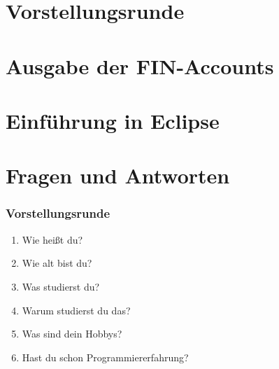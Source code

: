 \documentclass[12pt]{beamer}
\begin{document}
\section{Vorstellungsrunde}
\section{Ausgabe der FIN-Accounts}
\section{Einführung in Eclipse}
\section{Fragen und Antworten}

\begin{frame}
	\frametitle{Vorstellungsrunde}
	\begin{enumerate}
		\item Wie heißt du?
		\item Wie alt bist du?
		\item Was studierst du?
		\item Warum studierst du das?
		\item Was sind dein Hobbys?
		\item Hast du schon Programmiererfahrung?
	\end{enumerate}
\end{frame}
\end{document}
